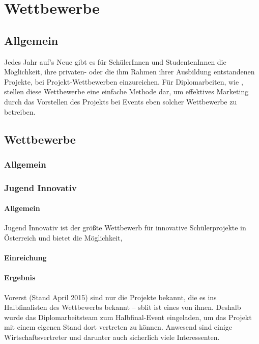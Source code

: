 \chapter{Wettbewerbe}
\renewcommand{\kapitelautor}{Autor: Andreas Novak}

\section{Allgemein}
Jedes Jahr auf's Neue gibt es für SchülerInnen und StudentenInnen die Möglichkeit, ihre privaten-
oder die ihm Rahmen ihrer Ausbildung entstandenen Projekte, bei Projekt-Wettbewerben
einzureichen. Für Diplomarbeiten, wie \sblit, stellen diese Wettbewerbe eine einfache
Methode dar, um effektives Marketing durch das Vorstellen des Projekts bei Events eben solcher
Wettbewerbe zu betreiben.

\section{Wettbewerbe}
\subsection{Allgemein}


\subsection{Jugend Innovativ}
\subsubsection{Allgemein}
Jugend Innovativ ist der größte Wettbewerb für innovative Schülerprojekte in Österreich und
bietet die Möglichkeit,
\subsubsection{Einreichung}

\subsubsection{Ergebnis}
Vorerst (Stand April 2015) sind nur die Projekte bekannt, die es ins Halbfinalisten des
Wettbewerbs bekannt -- sblit ist eines von ihnen. Deshalb wurde das Diplomarbeitsteam
zum Halbfinal-Event eingeladen, um das Projekt mit einem eigenen Stand dort vertreten
zu können. Anwesend sind einige Wirtschaftsvertreter und darunter auch sicherlich viele
Interessenten.

